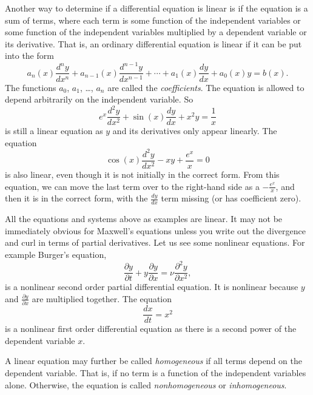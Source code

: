 \documentclass{ximera}
\begin{document}
Another way to determine if a differential equation is linear is if the equation is a sum of terms, where each term is some function of the independent variables or some function of the independent variables multiplied by a dependent variable or its derivative. That is, an ordinary differential equation is linear if it can be put into the form
\begin{equation} \label{classification:eqlingen}
    a_n(x) \frac{d^n y}{dx^n} + a_{n-1}(x) \frac{d^{n-1} y}{dx^{n-1}} + \cdots + a_{1}(x) \frac{dy}{dx} + a_{0}(x) y = b(x) .
\end{equation}
The functions $a_0$, $a_1$, \ldots, $a_n$ are called the \emph{coefficients}. The equation is allowed to depend arbitrarily on the independent variable. So 
\begin{equation} \label{classification:eqlinex}
    e^x \frac{d^2 y}{dx^2} + \sin(x) \frac{d y}{dx} + x^2 y = \frac{1}{x}
\end{equation}
is still a linear equation as $y$ and its derivatives only appear linearly. The equation
\[ 
    \cos(x) \frac{d^2y}{dx^2} - xy + \frac{e^x}{x} = 0 
\] 
is also linear, even though it is not initially in the correct form. From this equation, we can move the last term over to the right-hand side as a $-\frac{e^x}{x}$, and then it is in the correct form, with the $\frac{dy}{dx}$ term missing (or has coefficient zero).

All the equations and systems above as examples are linear. It may not be immediately obvious for Maxwell's equations unless you write out the divergence and curl in terms of partial derivatives.  Let us see some nonlinear equations.  For example Burger's equation,
\begin{equation*}
    \frac{\partial y}{\partial t} + y \frac{\partial y}{\partial x} = \nu \frac{\partial^2 y}{\partial x^2} ,
\end{equation*}
is a nonlinear second order partial differential equation.  It is nonlinear because $y$ and $\frac{\partial y}{\partial x}$ are multiplied together. The equation
\begin{equation} \label{classification:eqnonlinode}
    \frac{dx}{dt} = x^2
\end{equation}
is a nonlinear first order differential equation as there is a second power of the dependent variable $x$.

\begin{definition}
    A linear equation may further be called \emph{homogeneous} if all terms depend on the dependent variable.  That is, if no term is a function of the independent variables alone.  Otherwise, the equation is called \emph{nonhomogeneous} or \emph{inhomogeneous}.
\end{definition}
\end{document}
